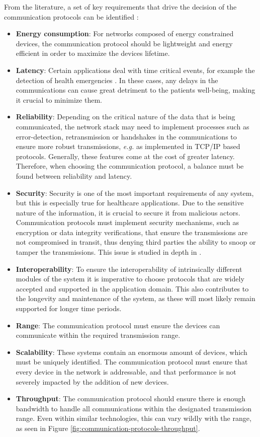 From the literature, a set of key requirements that drive the decision of the communication protocols can be identified \cite{Baker2017, Catarinucci2015, Adame2018}:

\begin{itemize}
    \item \textbf{Energy consumption}: For networks composed of energy constrained devices, the communication protocol should be lightweight and energy efficient in order to maximize the devices lifetime. 
    \item \textbf{Latency}: Certain applications deal with time critical events, for example the detection of health emergencies \cite{Catarinucci2015}. In these cases, any delays in the communications can cause great detriment to the patients well-being, making it crucial to minimize them.
    \item \textbf{Reliability}: Depending on the critical nature of the data that is being communicated, the network stack may need to implement processes such as error-detection, retransmission or handshakes in the communications to ensure more robust transmissions, \textit{e.g.} as implemented in TCP/IP based protocols. Generally, these features come at the cost of greater latency. Therefore, when choosing the communication protocol, a balance must be found between reliability and latency.
    \item \textbf{Security}: Security is one of the most important requirements of any system, but this is especially true for healthcare applications. Due to the sensitive nature of the information, it is crucial to secure it from malicious actors. Communication protocols must implement security mechanisms, such as encryption or data integrity verifications, that ensure the transmissions are not compromised in transit, thus denying third parties the ability to snoop or tamper the transmissions. This issue is studied in depth in \cite{Gope2016}.
    \item \textbf{Interoperability}: To ensure the interoperability of intrinsically different modules of the system it is imperative to choose protocols that are widely accepted and supported in the application domain. This also contributes to the longevity and maintenance of the system, as these will most likely remain supported for longer time periods. 
    \item \textbf{Range}: The communication protocol must ensure the devices can communicate within the required transmission range.
    \item \textbf{Scalability}: These systems contain an enormous amount of devices, which must be uniquely identified. The communication protocol must ensure that every device in the network is addressable, and that performance is not severely impacted by the addition of new devices.
    \item \textbf{Throughput}: The communication protocol should ensure there is enough bandwidth to handle all communications within the designated transmission range. Even within similar technologies, this can vary wildly with the range, as seen in Figure \ref{fig:communication-protocols-throughput}.  

\end{itemize}

